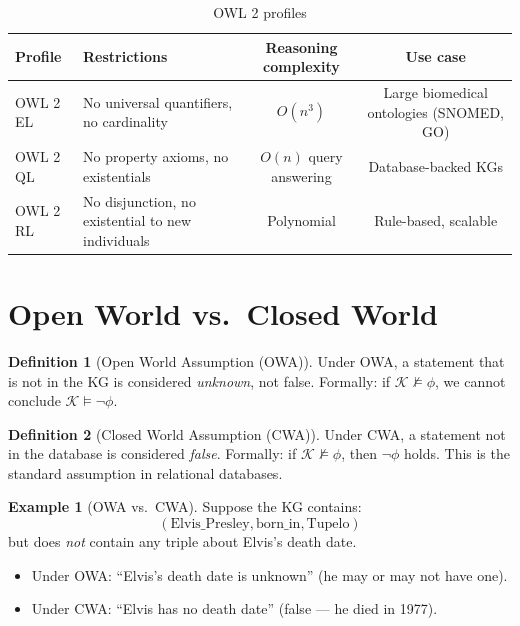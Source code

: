 \documentclass[11pt,a4paper,oneside,openany]{book}
\theoremstyle{definition}
\newtheorem{definition}{Definition}[chapter]
\newtheorem{example}{Example}[chapter]
\theoremstyle{plain}
\theoremstyle{remark}
\newcommand{\kg}{\mathcal{K}}
\begin{document}
\begin{table}[h]
	\centering
	\caption{OWL 2 profiles}
	\label{tab:owl-profiles}
	\begin{tabular}{lp{5cm}cc}
		\toprule
		Profile  & Restrictions                                      & Reasoning complexity   & Use case                                 \\
		\midrule
		OWL 2 EL & No universal quantifiers, no cardinality          & $O(n^3)$               & Large biomedical ontologies (SNOMED, GO) \\
		OWL 2 QL & No property axioms, no existentials               & $O(n)$ query answering & Database-backed KGs                      \\
		OWL 2 RL & No disjunction, no existential to new individuals & Polynomial             & Rule-based, scalable                     \\
		\bottomrule
	\end{tabular}
\end{table}

\section{Open World vs.\ Closed World}\label{sec:owa-cwa}

\begin{definition}[Open World Assumption (OWA)]
	Under OWA, a statement that is not in the KG is considered \emph{unknown}, not false. Formally: if $\kg \not\models \phi$, we cannot conclude $\kg \models \neg\phi$.
\end{definition}

\begin{definition}[Closed World Assumption (CWA)]
	Under CWA, a statement not in the database is considered \emph{false}. Formally: if $\kg \not\models \phi$, then $\neg\phi$ holds. This is the standard assumption in relational databases.
\end{definition}

\begin{example}[OWA vs.\ CWA]
	Suppose the KG contains:
	$$(\text{Elvis\_Presley}, \text{born\_in}, \text{Tupelo})$$
	but does \emph{not} contain any triple about Elvis's death date.

	\begin{itemize}
		\item Under OWA: ``Elvis's death date is unknown'' (he may or may not have one).
		\item Under CWA: ``Elvis has no death date'' (false --- he died in 1977).
	\end{itemize}
\end{example}
\end{document}
